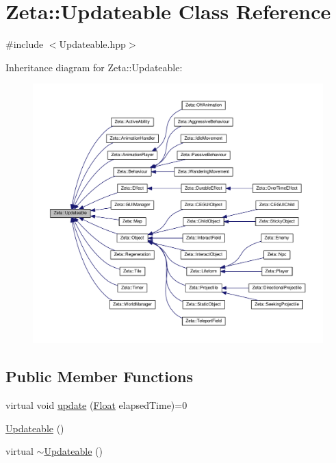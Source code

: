 \hypertarget{classZeta_1_1Updateable}{\section{Zeta\+:\+:Updateable Class Reference}
\label{classZeta_1_1Updateable}
}


{\ttfamily \#include $<$Updateable.\+hpp$>$}



Inheritance diagram for Zeta\+:\+:Updateable\+:\nopagebreak
\begin{figure}[H]
\begin{center}
\leavevmode
\includegraphics[width=350pt]{classZeta_1_1Updateable__inherit__graph}
\end{center}
\end{figure}
\subsection*{Public Member Functions}
\begin{DoxyCompactItemize}
\item 
virtual void \hyperlink{classZeta_1_1Updateable_af4006bfccb762454b4da08786ad93de0}{update} (\hyperlink{namespaceZeta_a1e0a1265f9b3bd3075fb0fabd39088ba}{Float} elapsed\+Time)=0
\item 
\hyperlink{classZeta_1_1Updateable_a8a6e51396cb58f5a0ce084f7909d5c6e}{Updateable} ()
\item 
virtual \hyperlink{classZeta_1_1Updateable_a38e0f0fb19115ebc4ca999fea2ca995d}{$\sim$\+Updateable} ()
\end{DoxyCompactItemize}


